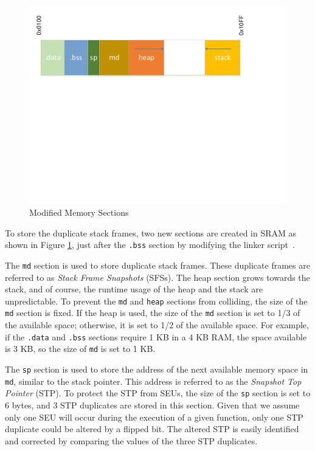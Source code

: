 \begin{figure}
\centering
\includegraphics[scale=0.35]{figures/modified_memory_model.pdf}
\vspace{5pt}
\caption{Modified Memory Sections}
\label{fig:modified_ram_map}
\end{figure}

To store the duplicate stack frames, two new sections are created in SRAM as shown in Figure \ref{fig:modified_ram_map}, just after the \texttt{.bss} section by modifying the linker script~\cite{linkerscript}. 

The \texttt{md} section is used to store duplicate stack frames. These duplicate frames are referred to as \textit{Stack Frame Snapshots} (SFSs). The heap section grows towards the stack, and of course, the runtime usage of the heap and the stack are unpredictable. To prevent the \texttt{md} and \texttt{heap} sections from colliding, the size of the \texttt{md} section is fixed. If the heap is used, the size of the \texttt{md} section is set to 1/3 of the available space; otherwise, it is set to 1/2 of the available space. For example, if the \texttt{.data} and \texttt{.bss} sections require 1 KB in a 4 KB RAM, the space available is 3 KB, so the size of \texttt{md} is set to 1 KB.

The \texttt{sp} section is used to store the address of the next available memory space in \texttt{md}, similar to the stack pointer. This address is referred to as the \textit{Snapshot Top Pointer} (STP). To protect the STP from SEUs, the size of the \texttt{sp} section is set to 6 bytes, and 3 STP duplicates are stored in this section. Given that we assume only one SEU will occur during the execution of a given function, only one STP duplicate could be altered by a flipped bit. The altered STP is easily identified and corrected by comparing the values of the three STP duplicates.

